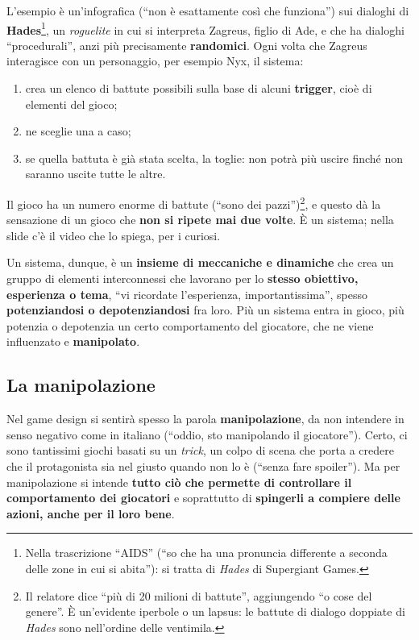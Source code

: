 L'esempio è un'infografica (``non è esattamente così che funziona'') sui dialoghi
di \textbf{Hades}\footnote{Nella trascrizione ``AIDS'' (``so che ha una pronuncia
differente a seconda delle zone in cui si abita''): si tratta di \emph{Hades} di
Supergiant Games.}, un \emph{roguelite} in cui si interpreta Zagreus, figlio di
Ade, e che ha dialoghi ``procedurali'', anzi più precisamente
\textbf{randomici}. Ogni volta che Zagreus interagisce con un personaggio, per
esempio Nyx, il sistema:
\begin{enumerate}
  \item crea un elenco di battute possibili sulla base di alcuni
        \textbf{trigger}, cioè di elementi del gioco;
  \item ne sceglie una a caso;
  \item se quella battuta è già stata scelta, la toglie: non potrà più uscire
        finché non saranno uscite tutte le altre.
\end{enumerate}
Il gioco ha un numero enorme di battute (``sono dei pazzi'')\footnote{Il relatore
dice ``più di 20 milioni di battute'', aggiungendo ``o cose del genere''. È
un'evidente iperbole o un lapsus: le battute di dialogo doppiate di \emph{Hades}
sono nell'ordine delle ventimila.}, e questo dà la sensazione di un gioco che
\textbf{non si ripete mai due volte}. È un sistema; nella slide c'è il video che
lo spiega, per i curiosi.

Un sistema, dunque, è un \textbf{insieme di meccaniche e dinamiche} che crea un
gruppo di elementi interconnessi che lavorano per lo \textbf{stesso obiettivo,
esperienza o tema}, ``vi ricordate l'esperienza, importantissima'', spesso
\textbf{potenziandosi o depotenziandosi} fra loro. Più un sistema entra in gioco,
più potenzia o depotenzia un certo comportamento del giocatore, che ne viene
influenzato e \textbf{manipolato}.

\subsection{La manipolazione}

Nel game design si sentirà spesso la parola \textbf{manipolazione}, da non
intendere in senso negativo come in italiano (``oddio, sto manipolando il
giocatore''). Certo, ci sono tantissimi giochi basati su un \emph{trick}, un
colpo di scena che porta a credere che il protagonista sia nel giusto quando non
lo è (``senza fare spoiler''). Ma per manipolazione si intende \textbf{tutto ciò
che permette di controllare il comportamento dei giocatori} e soprattutto di
\textbf{spingerli a compiere delle azioni, anche per il loro bene}.

